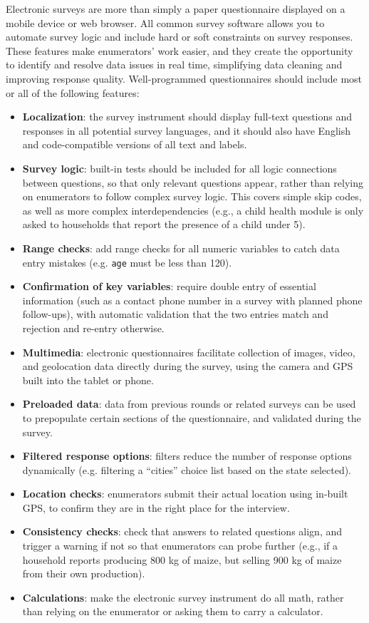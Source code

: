 Electronic surveys are more than simply
a paper questionnaire displayed on a mobile device or web browser.
All common survey software allows you to automate survey logic
and include hard or soft constraints on survey responses.
These features make enumerators' work easier,
and they create the opportunity to identify and resolve
data issues in real time,
simplifying data cleaning and improving response quality.
Well-programmed questionnaires should include
most or all of the following features:

\begin{itemize}
  \item{\textbf{Localization}}: the survey instrument should display full-text questions and responses in all potential survey languages, and it should also have English and code-compatible versions of all text and labels.
	\item{\textbf{Survey logic}}: built-in tests should be included for all logic connections between questions, so that only relevant questions appear, rather than relying on enumerators to follow complex survey logic. This covers simple skip codes, as well as more complex interdependencies (e.g., a child health module is only asked to households that report the presence of a child under 5).
	\item{\textbf{Range checks}}: add range checks for all numeric variables to catch data entry mistakes (e.g. \texttt{age} must be less than 120).
	\item{\textbf{Confirmation of key variables}}: require double entry of essential information (such as a contact phone number in a survey with planned phone follow-ups), with automatic validation that the two entries match and rejection and re-entry otherwise.
	\item{\textbf{Multimedia}}: electronic questionnaires facilitate collection of images, video, and geolocation data directly during the survey, using the camera and GPS built into the tablet or phone.
	\item{\textbf{Preloaded data}}: data from previous rounds or related surveys can be used to prepopulate certain sections of the questionnaire, and validated during the survey.
	\item{\textbf{Filtered response options}}: filters reduce the number of response options dynamically (e.g. filtering a ``cities'' choice list based on the state selected).
	\item{\textbf{Location checks}}: enumerators submit their actual location using in-built GPS, to confirm they are in the right place for the interview.
	\item{\textbf{Consistency checks}}: check that answers to related questions align, and trigger a warning if not so that enumerators can probe further (e.g., if a household reports producing 800 kg of maize, but selling 900 kg of maize from their own production).
	\item{\textbf{Calculations}}: make the electronic survey instrument do all math, rather than relying on the enumerator or asking them to carry a calculator.
\end{itemize}

